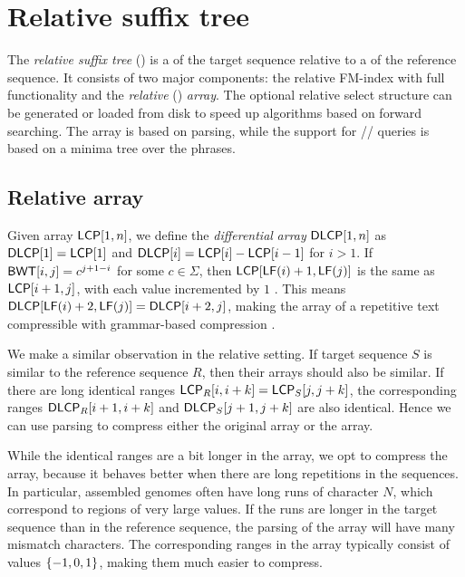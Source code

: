 

\section{Relative suffix tree}

The \emph{relative suffix tree} (\RCST) is a \CSTnpr{} of the
target sequence relative to a \CST{} of the reference sequence. It consists of
two major components: the relative FM-index with full functionality and the
\emph{relative} \LCP{} (\RLCP) \emph{array}. The optional relative select
structure can be generated or loaded from disk to speed up algorithms based on
forward searching. The \RLCP{} array is based on \RLZ{} parsing, while the
support for \nsv/\psv/\rmq{} queries is based on a minima tree over the
phrases.

\subsection{Relative \LCP{} array}

Given \LCP{} array $\mathsf{LCP}[1,n]$, we define the \emph{differential} \LCP{}
\emph{array} $\mathsf{DLCP}[1,n]$ as $\mathsf{DLCP}[1] = \mathsf{LCP}[1]$ and $\mathsf{DLCP}[i] = \mathsf{LCP}[i]
- \mathsf{LCP}[i-1]$ for $i > 1$. If $\mathsf{BWT}[i,j] = c^{j+1-i}$ for some $c \in
\Sigma$, then $\mathsf{LCP}[\mathsf{LF}(i)+1,\mathsf{LF}(j)]$ is the same as $\mathsf{LCP}[i+1,j]$, with
each value incremented by $1$ \cite{Fischer2009a}. This means
$\mathsf{DLCP}[\mathsf{LF}(i)+2,\mathsf{LF}(j)] = \mathsf{DLCP}[i+2,j]$, making the \DLCP{} array of a
repetitive text compressible with grammar-based compression
\cite{Abeliuk2013}.

We make a similar observation in the relative setting. If target sequence $S$
is similar to the reference sequence $R$, then their \LCP{} arrays should also
be similar. If there are long identical ranges $\mathsf{LCP}_{R}[i,i+k] =
\mathsf{LCP}_{S}[j,j+k]$, the corresponding \DLCP{} ranges $\mathsf{DLCP}_{R}[i+1,i+k]$ and
$\mathsf{DLCP}_{S}[j+1,j+k]$ are also identical. Hence we can use \RLZ{} parsing to
compress either the original \LCP{} array or the \DLCP{} array.

While the identical ranges are a bit longer in the \LCP{} array, we opt to
compress the \DLCP{} array, because it behaves better when there are long
repetitions in the sequences. In particular, assembled genomes often have long
runs of character $N$, which correspond to regions of very large \LCP{}
values. If the runs are longer in the target sequence than in the reference
sequence, the \RLZ{} parsing of the \LCP{} array will have many
mismatch characters. The corresponding ranges in the
\DLCP{} array typically consist of values $\{ -1, 0, 1 \}$, making them much
easier to compress.

